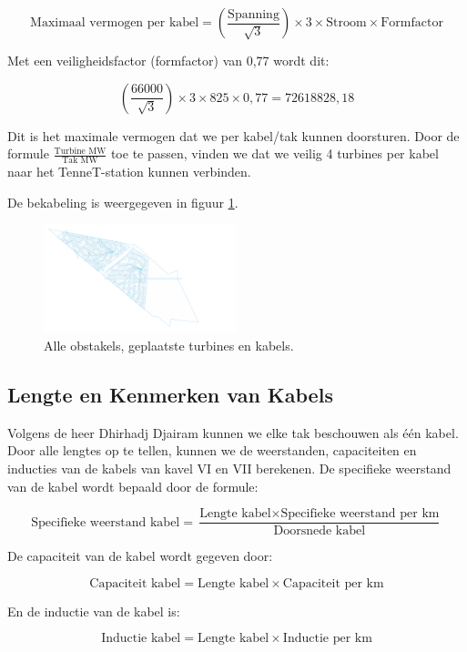 \[
\text{{Maximaal vermogen per kabel}} = \left(\frac{{\text{{Spanning}}}}{{\sqrt{3}}}\right) \times 3 \times \text{{Stroom}} \times \text{{Formfactor}}
\]

Met een veiligheidsfactor (formfactor) van 0,77 wordt dit:

\[
\left(\frac{{66000}}{{\sqrt{3}}}\right) \times 3 \times 825 \times 0,77 = 72618828,18
\]

Dit is het maximale vermogen dat we per kabel/tak kunnen doorsturen. Door de formule \(\frac{{\text{{Turbine MW}}}}{{\text{{Tak MW}}}}\) toe te passen, vinden we dat we veilig 4 turbines per kabel naar het TenneT-station kunnen verbinden.

De bekabeling is weergegeven in figuur \ref{fig:windparktotaal}.

\begin{figure}[H]
\centering
\includegraphics[width=0.5\textwidth, angle=270]{IMG/Kavelindeling/Windpark v30.png}
\caption{Alle obstakels, geplaatste turbines en kabels.}
\label{fig:windparktotaal}
\end{figure}

\subsection{Lengte en Kenmerken van Kabels}
Volgens de heer Dhirhadj Djairam kunnen we elke tak beschouwen als één kabel. Door alle lengtes op te tellen, kunnen we de weerstanden, capaciteiten en inducties van de kabels van kavel VI en VII berekenen. De specifieke weerstand van de kabel wordt bepaald door de formule:

\[
\text{{Specifieke weerstand kabel}} = \frac{{\text{{Lengte kabel}} \times \text{{Specifieke weerstand per km}}}}{{\text{{Doorsnede kabel}}}}
\]

De capaciteit van de kabel wordt gegeven door:

\[
\text{{Capaciteit kabel}} = \text{{Lengte kabel}} \times \text{{Capaciteit per km}}
\]

En de inductie van de kabel is:

\[
\text{{Inductie kabel}} = \text{{Lengte kabel}} \times \text{{Inductie per km}}
\]


